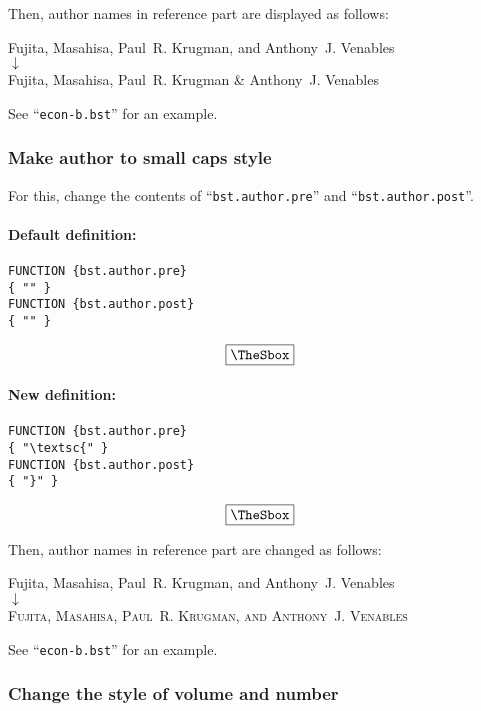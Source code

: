 \documentclass[10pt]{article}
\newenvironment{Frame}%
{\setlength{\fboxsep}{15pt}
\setlength{\mylength}{\linewidth}%
\addtolength{\mylength}{-2\fboxsep}%
\addtolength{\mylength}{-2\fboxrule}%
\Sbox
\minipage{\mylength}%
\setlength{\abovedisplayskip}{0pt}%
\setlength{\belowdisplayskip}{0pt}%
}%
{\endminipage\endSbox
\[\fbox{\TheSbox}\]}
\begin{document}
Then, author names in reference part are displayed as follows:
\begin{center}
Fujita, Masahisa, Paul~R. Krugman, and Anthony~J. Venables \\
 $\downarrow$ \\
Fujita, Masahisa, Paul~R. Krugman \& Anthony~J. Venables 
\end{center}

See ``\texttt{econ-b.bst}'' for an example.

\subsubsection{Make author to small caps style}

For this, change the contents of ``\texttt{bst.author.pre}'' and ``\texttt{bst.author.post}''.
\paragraph{Default definition:}
\begin{Frame}
\begin{verbatim}
FUNCTION {bst.author.pre}
{ "" }
FUNCTION {bst.author.post}
{ "" }
\end{verbatim}
\end{Frame}

\paragraph{New definition:}
\begin{Frame}
\begin{verbatim}
FUNCTION {bst.author.pre}
{ "\textsc{" }
FUNCTION {bst.author.post}
{ "}" }
\end{verbatim}
\end{Frame}

Then, author names in reference part are changed as follows:
\begin{center}
Fujita, Masahisa, Paul~R. Krugman, and Anthony~J. Venables \\
 $\downarrow$ \\
\textsc{Fujita, Masahisa, Paul~R. Krugman, and Anthony~J. Venables}
\end{center}

See ``\texttt{econ-b.bst}'' for an example.

\subsubsection{Change the style of volume and number}
\end{document}
